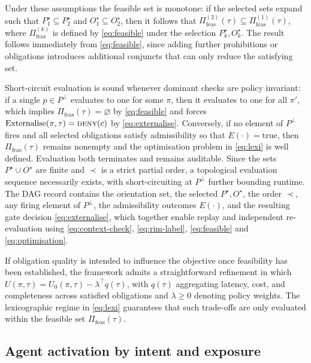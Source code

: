\documentclass[oneside,10pt]{swissi}
\begin{document}
Under these assumptions the feasible set is monotone: if the selected sets expand such that \(P^{\star}_1\subseteq P^{\star}_2\) and \(O^{\star}_1\subseteq O^{\star}_2\), then it follows that \(\Pi_{\mathrm{feas}}^{(2)}(\tau)\subseteq \Pi_{\mathrm{feas}}^{(1)}(\tau)\), where \(\Pi_{\mathrm{feas}}^{(k)}\) is defined by \eqref{eq:feasible} under the selection \(P^{\star}_k,O^{\star}_k\). The result follows immediately from \eqref{eq:feasible}, since adding further prohibitions or obligations introduces additional conjuncts that can only reduce the satisfying set.

Short-circuit evaluation is sound whenever dominant checks are policy invariant: if a single \(p\in P^{\perp}\) evaluates to one for some \(\pi\), then it evaluates to one for all \(\pi'\), which implies \(\Pi_{\mathrm{feas}}(\tau)=\varnothing\) by \eqref{eq:feasible} and forces \(\mathrm{Externalise}(\pi,\tau)=\textsc{deny}(c)\) by \eqref{eq:externalise}. Conversely, if no element of \(P^{\perp}\) fires and all selected obligations satisfy admissibility so that \(E(\cdot)=\text{true}\), then \(\Pi_{\mathrm{feas}}(\tau)\) remains nonempty and the optimisation problem in \eqref{eq:lexi} is well defined. Evaluation both terminates and remains auditable. Since the sets \(P^{\star}\cup O^{\star}\) are finite and \(\prec\) is a strict partial order, a topological evaluation sequence necessarily exists, with short-circuiting at \(P^{\perp}\) further bounding runtime. The DAG record contains the orientation set, the selected \(P^{\star},O^{\star}\), the order \(\prec\), any firing element of \(P^{\perp}\), the admissibility outcomes \(E(\cdot)\), and the resulting gate decision \eqref{eq:externalise}, which together enable replay and independent re-evaluation using \eqref{eq:context-check}, \eqref{eq:rim-label}, \eqref{eq:feasible} and \eqref{eq:optimisation}.

If obligation quality is intended to influence the objective once feasibility has been established, the framework admits a straightforward refinement in which \(U(\pi,\tau)=U_0(\pi,\tau)-\lambda^\top q(\tau)\), with \(q(\tau)\) aggregating latency, cost, and completeness across satisfied obligations and \(\lambda\ge 0\) denoting policy weights. The lexicographic regime in \eqref{eq:lexi} guarantees that such trade-offs are only evaluated within the feasible set \(\Pi_{\mathrm{feas}}(\tau)\).

\subsection{Agent activation by intent and exposure}
\end{document}
